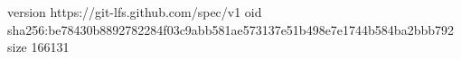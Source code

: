 version https://git-lfs.github.com/spec/v1
oid sha256:be78430b8892782284f03c9abb581ae573137e51b498e7e1744b584ba2bbb792
size 166131
